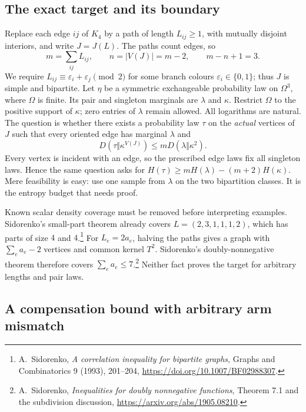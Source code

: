 \subsection{The exact target and its boundary}

Replace each edge $ij$ of $K_4$ by a path of length $L_{ij}\geq1$,
with mutually disjoint interiors, and write $J=J(L)$.
The paths count edges, so
\[
 m=\sum_{ij}L_{ij},\qquad n=|V(J)|=m-2,\qquad m-n+1=3.
\]
We require $L_{ij}\equiv\varepsilon_i+\varepsilon_j\pmod2$ for some
branch colours $\varepsilon_i\in\{0,1\}$; thus $J$ is simple and bipartite.
Let $\eta$ be a symmetric exchangeable probability law on $\Omega^3$, where
$\Omega$ is finite.  Its pair and singleton marginals are $\lambda$ and
$\kappa$.  Restrict $\Omega$ to the positive support of $\kappa$; zero
entries of $\lambda$ remain allowed.  All logarithms are natural.
The question is whether there exists a probability law $\tau$ on the
\emph{actual} vertices of $J$ such that every oriented edge has marginal
$\lambda$ and
\begin{equation}
 D(\tau\Vert\kappa^{V(J)})\leq mD(\lambda\Vert\kappa^2).
 \label{eq:rank3-entropy-target}
\end{equation}
Every vertex is incident with an edge, so the prescribed edge laws fix all
singleton laws.  Hence the same question asks for
$H(\tau)\geq mH(\lambda)-(m+2)H(\kappa)$.
Mere feasibility is easy: use one sample from $\lambda$ on the two
bipartition classes.  It is the entropy budget that needs proof.

Known scalar density coverage must be removed before interpreting examples.  Sidorenko's
small-part theorem already covers $L=(2,3,1,1,1,2)$, which has parts of size
$4$ and $4$.\footnote{A.~Sidorenko, \emph{A correlation inequality for
bipartite graphs}, Graphs and Combinatorics 9 (1993), 201--204,
\url{https://doi.org/10.1007/BF02988307}.}
For $L_e=2a_e$, halving the paths gives a graph with $\sum_ea_e-2$
vertices and common kernel $T^2$.  Sidorenko's doubly-nonnegative theorem
therefore covers $\sum_ea_e\leq7$.\footnote{A.~Sidorenko,
\emph{Inequalities for doubly nonnegative functions}, Theorem 7.1 and
the subdivision discussion, \url{https://arxiv.org/abs/1905.08210}.}
Neither fact proves the target for arbitrary lengths and pair laws.

\subsection{A compensation bound with arbitrary arm mismatch}

